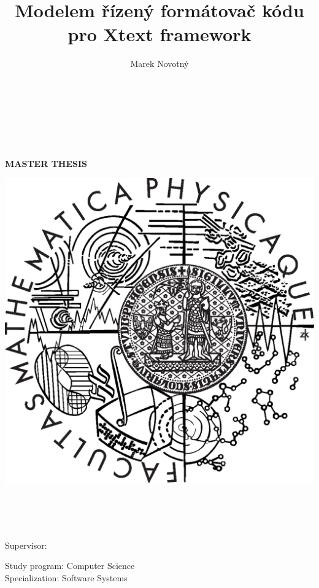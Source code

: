 \documentclass[12pt,notitlepage,a4paper]{report}
\title{Modelem řízený formátovač kódu pro Xtext framework}
\author{Marek Novotný}
\institute{Charles University in Prague}
\date{\displaydate{creationdate}}
\begin{document}
\begin{titlepage}
\begin{center}
\ \\
\vspace{\fill}

\large
\insertinstitute\\
\insertfaculty\\

\vspace{5mm}

{\Large\bf MASTER THESIS}

\vspace{10mm}

\includegraphics[scale=0.3]{pictures/Logo_MFF.eps}

\vspace{15mm}

{\Large \insertauthor}\\
\vspace{5mm}
{\Large\bf \insertenglishtitle}\\
\vspace{5mm}
\insertenglishdepartment\\
\end{center}
\vspace{15mm}

\large
\noindent Supervisor: \insertsupervisor
\vspace{1mm} 

\noindent Study program: Computer Science\\
Specialization: Software Systems

\vspace{\fill}

\begin{center}
\end{center}

\end{titlepage}
\end{document}
